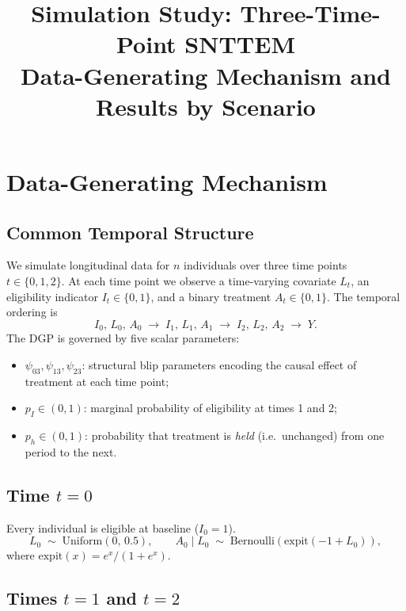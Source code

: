 \documentclass[12pt]{article}
\title{Simulation Study: Three-Time-Point SNTTEM\\[0.3em]
\large Data-Generating Mechanism and Results by Scenario}
\date{}
\begin{document}
\maketitle
\tableofcontents
\newpage

\section{Data-Generating Mechanism}

\subsection{Common Temporal Structure}

We simulate longitudinal data for $n$ individuals over three time points
$t\in\{0,1,2\}$.  At each time point we observe a time-varying covariate
$L_t$, an eligibility indicator $I_t\in\{0,1\}$, and a binary treatment
$A_t\in\{0,1\}$.  The temporal ordering is
\[
  I_0,\,L_0,\,A_0
  \;\longrightarrow\;
  I_1,\,L_1,\,A_1
  \;\longrightarrow\;
  I_2,\,L_2,\,A_2
  \;\longrightarrow\;
  Y.
\]
The DGP is governed by five scalar parameters:
\begin{itemize}
  \item $\psi_{03},\psi_{13},\psi_{23}$: structural blip parameters encoding
        the causal effect of treatment at each time point;
  \item $p_I\in(0,1)$: marginal probability of eligibility at times 1 and 2;
  \item $p_h\in(0,1)$: probability that treatment is \emph{held}
        (i.e.\ unchanged) from one period to the next.
\end{itemize}

\subsection{Time $t=0$}

Every individual is eligible at baseline ($I_0=1$).
\[
  L_0 \;\sim\; \mathrm{Uniform}(0,\,0.5),
  \qquad
  A_0\mid L_0 \;\sim\; \mathrm{Bernoulli}\!\left(\mathrm{expit}(-1+L_0)\right),
\]
where $\mathrm{expit}(x)=e^x/(1+e^x)$.

\subsection{Times $t=1$ and $t=2$}
\end{document}

